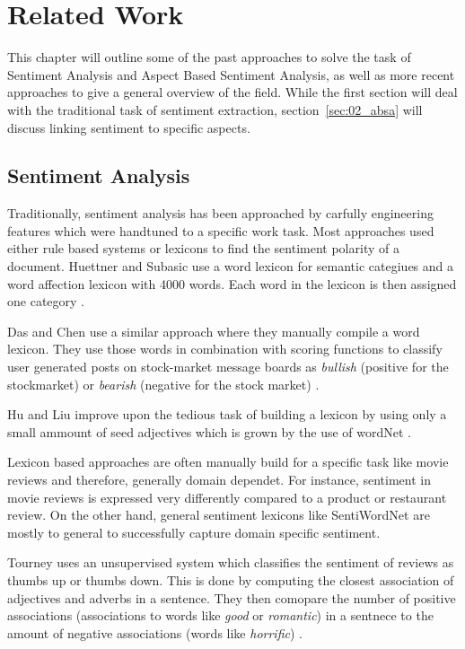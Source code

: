 \chapter{Related Work}
\label{ch:relWork}

This chapter will outline some of the past approaches to solve the task of Sentiment Analysis and Aspect Based Sentiment Analysis, as well as more recent approaches to give a general overview of the field. While the first section will deal with the traditional task of sentiment extraction, section~\ref{sec:02_absa} will discuss linking sentiment to specific aspects.

\section{Sentiment Analysis}

Traditionally, sentiment analysis has been approached by carfully engineering features which were handtuned to a specific work task. Most approaches used either rule based systems \cite{Popescu2005} or lexicons to find the sentiment polarity of a document. Huettner and Subasic use a word lexicon for semantic categiues and a word affection lexicon with 4000 words. Each word in the lexicon is then assigned one category \cite{Huettner2000}. 

Das and Chen use a similar approach where they manually compile a word lexicon. They use those words in combination with scoring functions to classify user generated posts on stock-market message boards as \textit{bullish} {(positive for the stockmarket)} or \textit{bearish} {(negative for the stock market)} \cite{Das2007}.

Hu and Liu improve upon the tedious task of building a lexicon by using only a small ammount of seed adjectives which is grown by the use of wordNet \cite{Hu2004}.
\medskip

Lexicon based approaches are often manually build for a specific task like movie reviews \cite{Tong2001, Thet2010} and therefore, generally domain dependet. For instance, sentiment in movie reviews is expressed very differently compared to a product or restaurant review. On the other hand, general sentiment lexicons like SentiWordNet \cite{Baccianella2010} are mostly to general to successfully capture domain specific sentiment.
\medskip

Tourney uses an unsupervised system which classifies the sentiment of reviews as thumbs up or thumbs down. This is done by computing the closest association of adjectives and adverbs in a sentence. They then comopare the number of positive associations {(associations to words like \textit{good} or \textit{romantic})} in a sentnece to the amount of negative associations {(words like \textit{horrific})} \cite{Turney2007}.
\medskip

